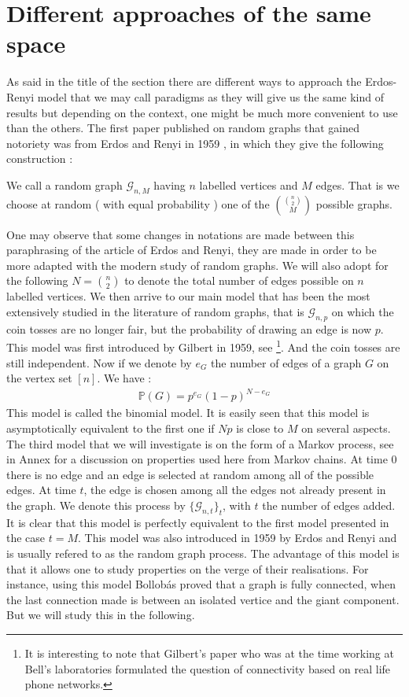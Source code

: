 \section{Different approaches of the same space}
As said in the title of the section there are different ways to approach the Erdos-Renyi model that we may call paradigms as they will give us the same kind of results but depending on the context, one might be much more convenient to use than the others.
\newline
The first paper published on random graphs that gained notoriety was from Erdos and Renyi in 1959 \cite{erdos59}, in which they give the following construction :
\begin{definition}
We call a random graph $\mathcal{G}_{n, M}$ having $n$ labelled vertices and $M$ edges. That is we choose at random ( with equal probability ) one of the $\binom{\binom{n}{2}}{M}$ possible graphs.
\end{definition}
One may observe that some changes in notations are made between this paraphrasing of the article of Erdos and Renyi, they are made in order to be more adapted with the modern study of random graphs. We will also adopt for the following $N = \binom{n}{2}$ to denote the total number of edges possible on $n$ labelled vertices.
\newline
We then arrive to our main model that has been the most extensively studied in the literature of random graphs, that is $\mathcal{G}_{n, p}$ on which the coin tosses are no longer fair, but the probability of drawing an edge is now $p$.
This model was first introduced by Gilbert in 1959, see \cite{Gilbert59}\footnote{It is interesting to note that Gilbert's paper who was at the time working at Bell's laboratories formulated the question of connectivity based on real life phone networks.}.
And the coin tosses are still independent. Now if we denote by $e_G$ the number of edges of a graph $G$ on the vertex set $[n]$. We have :
\begin{align}
	\mathbb{P}(G) = p^{e_G}(1-p)^{N-e_G}
\end{align}
This model is called the binomial model. It is easily seen that this model is asymptotically equivalent to the first one if $Np$ is close to $M$ on several aspects.
\newline
The third model that we will investigate is on the form of a Markov process, see in Annex for a discussion on properties used here from Markov chains. 
At time 0 there is no edge and an edge is selected at random among all of the possible edges. 
At time $t$, the edge is chosen among all the edges not already present in the graph. We denote this process by $\{\mathcal{G}_{n, t}\}_t$, with $t$ the number of edges added. 
It is clear that this model is perfectly equivalent to the first model presented in the case $t = M$. This model was also introduced in 1959 by Erdos and Renyi and is usually refered to as the random graph process.
The advantage of this model is that it allows one to study properties on the verge of their realisations.
For instance, using this model Bollob\'as proved that a graph is fully connected, when the last connection made is between an isolated vertice and the giant component. But we will study this in the following.




